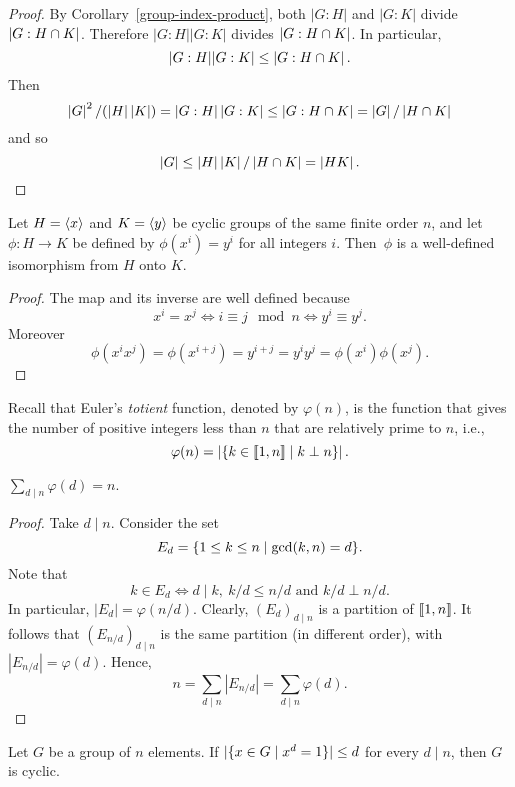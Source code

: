 \begin{proof} By Corollary~\ref{group-index-product}, both $|G:H|$ and $|G:K|$ divide $\left\vert{G:H\cap K}\right\vert$. Therefore $|G:H||G:K|$ divides $\left\vert{G:H\cap K}\right\vert$. In particular,
$$
    |G:H||G:K|\le\left\vert{G:H\cap K}\right\vert.
$$
Then
$$
    \left\vert{G}\right\vert^2/(\left\vert{H}\right\vert\left\vert{K}\right\vert) = \left\vert{G:H}\right\vert\left\vert{G:K}\right\vert\le\left\vert{G:H\cap K}\right\vert=\left\vert{G}\right\vert/\left\vert{H\cap K}\right\vert
$$
and so
$$
    \left\vert{G}\right\vert\le \left\vert{H}\right\vert\left\vert{K}\right\vert/\left\vert{H\cap K}\right\vert=\left\vert{HK}\right\vert.
$$
 \end{proof}

\begin{lem}
    Let $H = \langle x\rangle$ and $K = \langle y\rangle$ be cyclic groups of the same finite order $n$, and let $\phi\colon H\to K$ be defined by $\phi(x^i) = y^i$ for all integers $i$. Then~$\phi$ is a well-defined isomorphism from $H$ onto $K$.
\end{lem}

\begin{proof} The map and its inverse are well defined because
$$
    x^i=x^j\iff i\equiv j\mod n\iff y^i\equiv y^j.
$$
Moreover
$$
    \phi(x^ix^j)=\phi(x^{i+j})=y^{i+j}=y^iy^j=\phi(x^i)\phi(x^j).
$$
 \end{proof}

\medskip

Recall that Euler's \textsl{totient} function, denoted by $\varphi(n)$, is the function that gives the number of positive integers less than $n$ that are relatively prime to $n$, i.e.,
$$
    \varphi(n) = \left\vert{\{ k \in\llbracket1,n\rrbracket \mid k\perp n\}}\right\vert.
$$

\begin{thm}\label{thm:totient-sum}
    $\sum_{d\mid n}\varphi(d)=n$.
\end{thm}

\begin{proof}
    Take $d\mid n$. Consider the set
    $$
        E_d=\{1\le k\le n\mid \gcd(k,n)=d\}.
    $$
    Note that
    $$
        k\in E_d\iff
            d\mid k,\ k/d\le n/d \text{ and } k/d\perp n/d.
    $$
    In particular, $|E_d|=\varphi(n/d)$. Clearly, $(E_d)_{d\mid n}$ is a partition of $\llbracket1,n\rrbracket$. It follows that $(E_{n/d})_{d\mid n}$ is the same partition (in different order), with $|E_{n/d}|=\varphi(d)$. Hence,
    $$
        n = \sum_{d\mid n}|E_{n/d}|=\sum_{d\mid n}\varphi(d).
    $$
\end{proof}

\begin{cor}\label{cor:condition-for-cyclic-group}
    Let\/ $G$ be a group of\/ $n$ elements. If\/ $|\{x\in G\mid x^d=1\}|\le d$ for every\/ $d\mid n$, then\/ $G$ is cyclic.
\end{cor}

